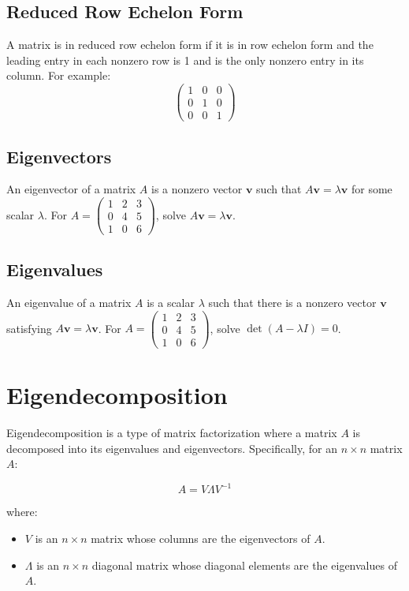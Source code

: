 \documentclass[12pt]{article}
\begin{document}
\subsection{Reduced Row Echelon Form}
A matrix is in reduced row echelon form if it is in row echelon form and the leading entry in each nonzero row is 1 and is the only nonzero entry in its column.
For example:
\[ \begin{pmatrix} 1 & 0 & 0 \\ 0 & 1 & 0 \\ 0 & 0 & 1 \end{pmatrix} \]

\subsection{Eigenvectors}
An eigenvector of a matrix \( A \) is a nonzero vector \( \mathbf{v} \) such that \( A\mathbf{v} = \lambda\mathbf{v} \) for some scalar \( \lambda \).
For \( A = \begin{pmatrix} 1 & 2 & 3 \\ 0 & 4 & 5 \\ 1 & 0 & 6 \end{pmatrix} \), solve \( A\mathbf{v} = \lambda\mathbf{v} \).

\subsection{Eigenvalues}
An eigenvalue of a matrix \( A \) is a scalar \( \lambda \) such that there is a nonzero vector \( \mathbf{v} \) satisfying \( A\mathbf{v} = \lambda\mathbf{v} \).
For \( A = \begin{pmatrix} 1 & 2 & 3 \\ 0 & 4 & 5 \\ 1 & 0 & 6 \end{pmatrix} \), solve \( \det(A - \lambda I) = 0 \).

\section{Eigendecomposition}


Eigendecomposition is a type of matrix factorization where a matrix \( A \) is decomposed into its eigenvalues and eigenvectors. Specifically, for an \( n \times n \) matrix \( A \):

\[ A = V \Lambda V^{-1} \]

where:
\begin{itemize}
    \item \( V \) is an \( n \times n \) matrix whose columns are the eigenvectors of \( A \).
    \item \( \Lambda \) is an \( n \times n \) diagonal matrix whose diagonal elements are the eigenvalues of \( A \).
\end{itemize}
\end{document}
